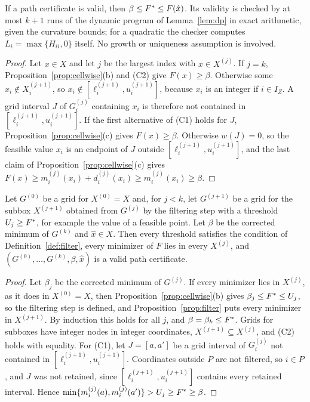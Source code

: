 \begin{theorem}\label{thm:certificate}
If a path certificate is valid, then $\beta\le F^{*}\le F(\hat x)$. Its
validity is checked by at most $k+1$ runs of the dynamic program of
Lemma~\ref{lem:dp} in exact arithmetic, given the curvature bounds; for a
quadratic the checker computes $L_i=\max\{H_{ii},0\}$ itself. No growth or
uniqueness assumption is involved.
\end{theorem}

\begin{proof}
Let $x\in X$ and let $j$ be the largest index with $x\in X^{(j)}$. If $j=k$,
Proposition~\ref{prop:cellwise}(b) and (C2) give $F(x)\ge\beta$. Otherwise
some $x_i\notin X^{(j+1)}_i$, so $x_i\notin[\ell_i^{(j+1)},u_i^{(j+1)}]$,
because $x_i$ is an integer if $i\in I_Z$. A grid interval $J$ of $G_i^{(j)}$
containing $x_i$ is therefore not contained in
$[\ell_i^{(j+1)},u_i^{(j+1)}]$. If the first alternative of (C1) holds for
$J$, Proposition~\ref{prop:cellwise}(c) gives $F(x)\ge\beta$. Otherwise
$w(J)=0$, so the feasible value $x_i$ is an endpoint of $J$ outside
$[\ell_i^{(j+1)},u_i^{(j+1)}]$, and the last claim of
Proposition~\ref{prop:cellwise}(c) gives
$F(x)\ge m^{(j)}_i(x_i)+d^{(j)}_i(x_i)\ge m^{(j)}_i(x_i)\ge\beta$.
\end{proof}

\begin{corollary}\label{cor:filtercert}
Let $G^{(0)}$ be a grid for $X^{(0)}=X$ and, for $j<k$, let $G^{(j+1)}$ be a
grid for the subbox $X^{(j+1)}$ obtained from $G^{(j)}$ by the filtering
step with a threshold
$U_j\ge F^{*}$, for example the value of a feasible point. Let $\beta$ be the
corrected minimum of $G^{(k)}$ and $\hat x\in X$. Then every threshold
satisfies the condition of Definition~\ref{def:filter}, every minimizer of
$F$ lies in every $X^{(j)}$, and $(G^{(0)},\dots,G^{(k)},\beta,\hat x)$ is a
valid path certificate.
\end{corollary}

\begin{proof}
Let $\beta_j$ be the corrected minimum of $G^{(j)}$. If every minimizer lies
in $X^{(j)}$, as it does in $X^{(0)}=X$, then
Proposition~\ref{prop:cellwise}(b) gives $\beta_j\le F^{*}\le U_j$, so the
filtering step is defined, and Proposition~\ref{prop:filter} puts every
minimizer in $X^{(j+1)}$. By induction this holds for all $j$, and
$\beta=\beta_k\le F^{*}$. Grids for subboxes have integer nodes in integer
coordinates, $X^{(j+1)}\subseteq X^{(j)}$, and (C2) holds with equality. For
(C1), let $J=[a,a']$ be a grid interval of $G_i^{(j)}$ not contained in
$[\ell_i^{(j+1)},u_i^{(j+1)}]$. Coordinates outside $P$ are not filtered, so
$i\in P$, and $J$ was not retained, since $[\ell_i^{(j+1)},u_i^{(j+1)}]$
contains every retained interval. Hence
$\min\{m^{(j)}_i(a),m^{(j)}_i(a')\}>U_j\ge F^{*}\ge\beta$.
\end{proof}

